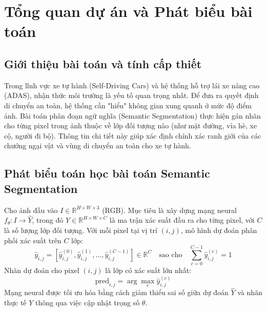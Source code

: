 \documentclass[a4paper,12pt]{report}
\begin{document}
\tableofcontents
\newpage

\chapter{Tổng quan dự án và Phát biểu bài toán}
\section{Giới thiệu bài toán và tính cấp thiết}
Trong lĩnh vực xe tự hành (Self-Driving Cars) và hệ thống hỗ trợ lái xe nâng cao (ADAS), nhận thức môi trường là yếu tố quan trọng nhất. Để đưa ra quyết định di chuyển an toàn, hệ thống cần "hiểu" không gian xung quanh ở mức độ điểm ảnh. 
Bài toán phân đoạn ngữ nghĩa (Semantic Segmentation) thực hiện gán nhãn cho từng pixel trong ảnh thuộc về lớp đối tượng nào (như mặt đường, vỉa hè, xe cộ, người đi bộ). Thông tin chi tiết này giúp xác định chính xác ranh giới của các chướng ngại vật và vùng di chuyển an toàn cho xe tự hành.

\section{Phát biểu toán học bài toán Semantic Segmentation}
Cho ảnh đầu vào $I \in \mathbb{R}^{H \times W \times 3}$ (RGB). Mục tiêu là xây dựng mạng neural $f_\theta: I \to \hat{Y}$, trong đó $\hat{Y} \in \mathbb{R}^{H \times W \times C}$ là ma trận xác suất đầu ra cho từng pixel, với $C$ là số lượng lớp đối tượng.
Với mỗi pixel tại vị trí $(i, j)$, mô hình dự đoán phân phối xác suất trên $C$ lớp:
$$\hat{y}_{i,j} = [\hat{y}_{i,j}^{(0)}, \hat{y}_{i,j}^{(1)}, \dots, \hat{y}_{i,j}^{(C-1)}] \in \mathbb{R}^C \quad \text{sao cho} \quad \sum_{c=0}^{C-1} \hat{y}_{i,j}^{(c)} = 1$$
Nhãn dự đoán cho pixel $(i, j)$ là lớp có xác suất lớn nhất:
$$\text{pred}_{i,j} = \arg\max_{c} \hat{y}_{i,j}^{(c)}$$
Mạng neural được tối ưu hóa bằng cách giảm thiểu sai số giữa dự đoán $\hat{Y}$ và nhãn thực tế $Y$ thông qua việc cập nhật trọng số $\theta$.
\end{document}
